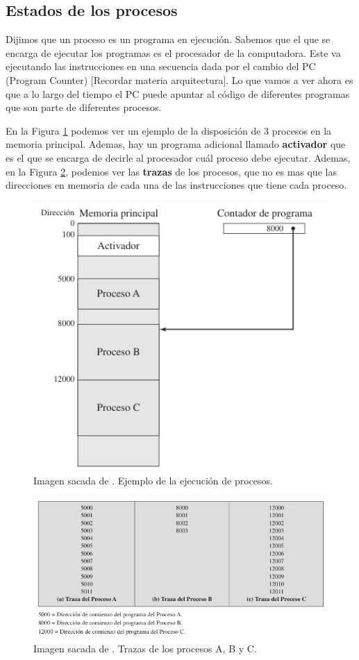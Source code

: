 \documentclass[12pt]{article}
\begin{document}
  \subsection{Estados de los procesos}
  Dijimos que un proceso es un programa en ejecución. Sabemos que el que se encarga de ejecutar los programas es el procesador de la computadora. Este va ejecutando las instrucciones en una secuencia dada por el cambio del PC (Program Counter) [Recordar materia arquitectura]. Lo que vamos a ver ahora es que a lo largo del tiempo el PC puede apuntar al código de diferentes programas que son parte de diferentes procesos.

  En la Figura \ref{fig:procesos-ejecución} podemos ver un ejemplo de la disposición de 3 procesos en la memoria principal. Ademas, hay un programa adicional llamado \textbf{activador} que es el que se encarga de decirle al procesador cuál proceso debe ejecutar. Ademas, en la Figura \ref{fig:trazas-procesos}, podemos ver las \textbf{trazas} de los procesos, que no es mas que las direcciones en memoria de cada una de las instrucciones que tiene cada proceso.

  \begin{figure}[H]
    \centering
    \includegraphics[width=0.6\linewidth]{imagenes/proceso-en-ejecucion.png}
    \caption{Imagen sacada de \parencite{sostallings}. Ejemplo de la ejecución de procesos.}
    \label{fig:procesos-ejecución}
  \end{figure}

  \begin{figure}[H]
    \centering
    \includegraphics[width=\linewidth]{imagenes/trazas-procesos.png}
    \caption{Imagen sacada de \parencite{sostallings}. Trazas de los procesos A, B y C.}
    \label{fig:trazas-procesos}
  \end{figure}
\end{document}

